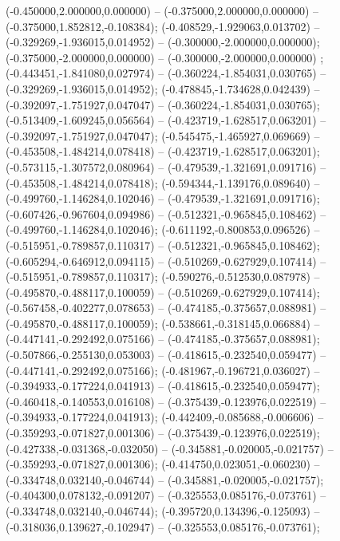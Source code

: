 (-0.450000,2.000000,0.000000) -- (-0.375000,2.000000,0.000000) -- (-0.375000,1.852812,-0.108384);
 (-0.408529,-1.929063,0.013702) -- (-0.329269,-1.936015,0.014952) -- (-0.300000,-2.000000,0.000000);
 (-0.375000,-2.000000,0.000000) -- (-0.300000,-2.000000,0.000000) ;
 (-0.443451,-1.841080,0.027974) -- (-0.360224,-1.854031,0.030765) -- (-0.329269,-1.936015,0.014952);
 (-0.478845,-1.734628,0.042439) -- (-0.392097,-1.751927,0.047047) -- (-0.360224,-1.854031,0.030765);
 (-0.513409,-1.609245,0.056564) -- (-0.423719,-1.628517,0.063201) -- (-0.392097,-1.751927,0.047047);
 (-0.545475,-1.465927,0.069669) -- (-0.453508,-1.484214,0.078418) -- (-0.423719,-1.628517,0.063201);
 (-0.573115,-1.307572,0.080964) -- (-0.479539,-1.321691,0.091716) -- (-0.453508,-1.484214,0.078418);
 (-0.594344,-1.139176,0.089640) -- (-0.499760,-1.146284,0.102046) -- (-0.479539,-1.321691,0.091716);
 (-0.607426,-0.967604,0.094986) -- (-0.512321,-0.965845,0.108462) -- (-0.499760,-1.146284,0.102046);
 (-0.611192,-0.800853,0.096526) -- (-0.515951,-0.789857,0.110317) -- (-0.512321,-0.965845,0.108462);
 (-0.605294,-0.646912,0.094115) -- (-0.510269,-0.627929,0.107414) -- (-0.515951,-0.789857,0.110317);
 (-0.590276,-0.512530,0.087978) -- (-0.495870,-0.488117,0.100059) -- (-0.510269,-0.627929,0.107414);
 (-0.567458,-0.402277,0.078653) -- (-0.474185,-0.375657,0.088981) -- (-0.495870,-0.488117,0.100059);
 (-0.538661,-0.318145,0.066884) -- (-0.447141,-0.292492,0.075166) -- (-0.474185,-0.375657,0.088981);
 (-0.507866,-0.255130,0.053003) -- (-0.418615,-0.232540,0.059477) -- (-0.447141,-0.292492,0.075166);
 (-0.481967,-0.196721,0.036027) -- (-0.394933,-0.177224,0.041913) -- (-0.418615,-0.232540,0.059477);
 (-0.460418,-0.140553,0.016108) -- (-0.375439,-0.123976,0.022519) -- (-0.394933,-0.177224,0.041913);
 (-0.442409,-0.085688,-0.006606) -- (-0.359293,-0.071827,0.001306) -- (-0.375439,-0.123976,0.022519);
 (-0.427338,-0.031368,-0.032050) -- (-0.345881,-0.020005,-0.021757) -- (-0.359293,-0.071827,0.001306);
 (-0.414750,0.023051,-0.060230) -- (-0.334748,0.032140,-0.046744) -- (-0.345881,-0.020005,-0.021757);
 (-0.404300,0.078132,-0.091207) -- (-0.325553,0.085176,-0.073761) -- (-0.334748,0.032140,-0.046744);
 (-0.395720,0.134396,-0.125093) -- (-0.318036,0.139627,-0.102947) -- (-0.325553,0.085176,-0.073761);
